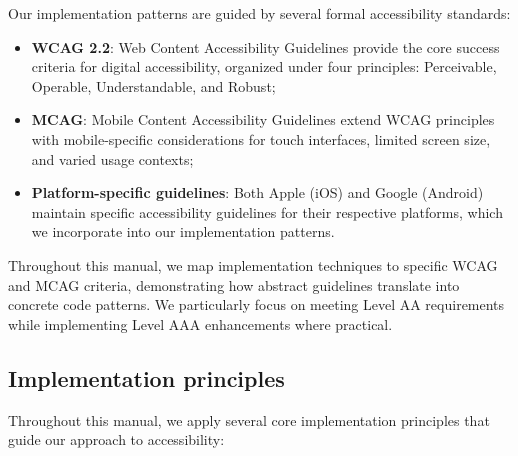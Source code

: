 Our implementation patterns are guided by several formal accessibility standards:

\begin{itemize}
    \item \textbf{WCAG 2.2}: Web Content Accessibility Guidelines provide the core success criteria for digital accessibility, organized under four principles: Perceivable, Operable, Understandable, and Robust;
    
    \item \textbf{MCAG}: Mobile Content Accessibility Guidelines extend WCAG principles with mobile-specific considerations for touch interfaces, limited screen size, and varied usage contexts;
    
    \item \textbf{Platform-specific guidelines}: Both Apple (iOS) and Google (Android) maintain specific accessibility guidelines for their respective platforms, which we incorporate into our implementation patterns.
\end{itemize}

Throughout this manual, we map implementation techniques to specific WCAG and MCAG criteria, demonstrating how abstract guidelines translate into concrete code patterns. We particularly focus on meeting Level AA requirements while implementing Level AAA enhancements where practical.

\subsection{Implementation principles}
\label{subsec:dev-principles}

Throughout this manual, we apply several core implementation principles that guide our approach to accessibility:

